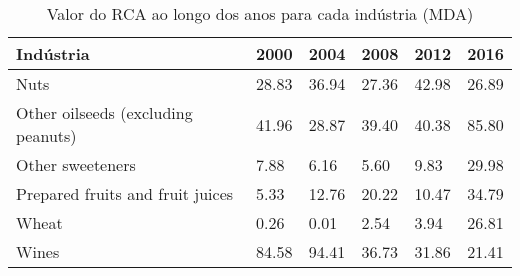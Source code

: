 \begin{table}
\centering
\caption{Valor do RCA ao longo dos anos para cada indústria (MDA)}
\begin{tabular}{p{6cm}p{1.5cm}p{1.5cm}p{1.5cm}p{1.5cm}p{1.5cm}}
\toprule
                         Indústria &  2000 &  2004 &  2008 &  2012 &  2016 \\
\midrule
                              Nuts & 28.83 & 36.94 & 27.36 & 42.98 & 26.89 \\
Other oilseeds (excluding peanuts) & 41.96 & 28.87 & 39.40 & 40.38 & 85.80 \\
                  Other sweeteners &  7.88 &  6.16 &  5.60 &  9.83 & 29.98 \\
  Prepared fruits and fruit juices &  5.33 & 12.76 & 20.22 & 10.47 & 34.79 \\
                             Wheat &  0.26 &  0.01 &  2.54 &  3.94 & 26.81 \\
                             Wines & 84.58 & 94.41 & 36.73 & 31.86 & 21.41 \\
\bottomrule
\end{tabular}
\end{table}

